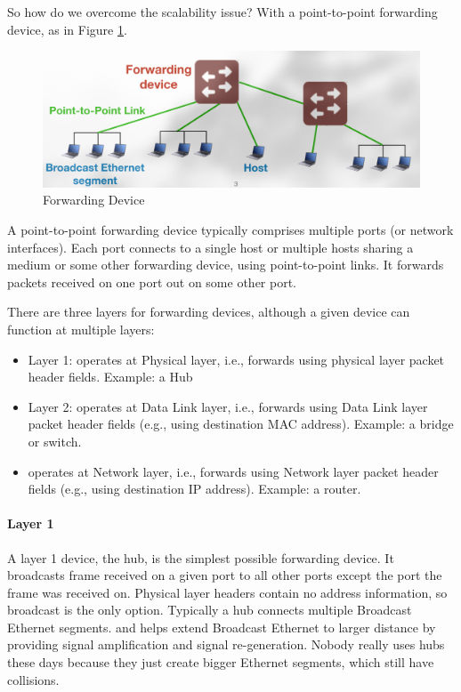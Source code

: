So how do we overcome the scalability issue?
With a point-to-point forwarding device, as in Figure
\ref{fig:forwardingdevice}.
\begin{figure}
    \includegraphics{images/forwarding-device.png}
    \caption{Forwarding Device}
    \label{fig:forwardingdevice}
\end{figure}
A point-to-point forwarding device
typically comprises multiple ports (or network interfaces).
Each port connects to a single host or multiple hosts sharing a
medium or some other forwarding device, using point-to-point links.
It forwards packets received on one port out on some other port.

There are three layers for forwarding devices, although a given
device can function at multiple layers:
\begin{itemize}
    \item Layer 1: operates at Physical layer, i.e.,
          forwards using physical layer
          packet header fields. Example: a Hub
    \item Layer 2: operates at Data Link layer, i.e.,
          forwards using Data Link layer
          packet header fields (e.g., using destination MAC address).
          Example: a bridge or switch.
    \item operates at Network layer, i.e., forwards using Network layer
          packet header fields (e.g., using destination IP address).
          Example: a router.
\end{itemize}

\paragraph{Layer 1} A layer 1 device, the hub, is the simplest possible
forwarding device. It broadcasts frame received on a given port to all
other ports except the port the frame was received on.
Physical layer headers contain no address information, so broadcast is
the only option. Typically a hub connects multiple Broadcast Ethernet segments.
and helps extend Broadcast Ethernet to larger distance
by providing signal amplification and signal re-generation. Nobody really uses
hubs these days because they just create bigger Ethernet segments,
which still have collisions.

